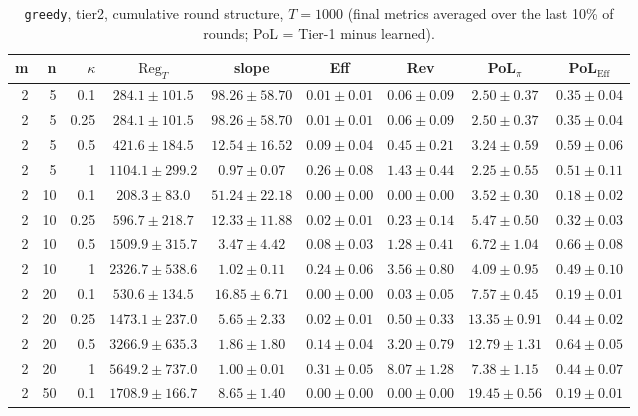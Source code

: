 \begin{table}[htbp]
\centering
\scriptsize
\caption{\texttt{greedy}, tier2, cumulative round structure, $T=1000$ (final metrics averaged over the last 10\% of rounds; PoL = Tier-1 minus learned).}
\label{tab:tier2_greedy_cumulative}
\begin{tabular}{@{}rrrcccccc@{}}
\toprule
m & n & $\kappa$ & $\mathrm{Reg}_T$ & slope & Eff & Rev & PoL$_\pi$ & PoL$_\mathrm{Eff}$ \\
\midrule
2 & 5 & 0.1 & $284.1 \pm 101.5$ & $98.26 \pm 58.70$ & $0.01 \pm 0.01$ & $0.06 \pm 0.09$ & $2.50 \pm 0.37$ & $0.35 \pm 0.04$ \\
2 & 5 & 0.25 & $284.1 \pm 101.5$ & $98.26 \pm 58.70$ & $0.01 \pm 0.01$ & $0.06 \pm 0.09$ & $2.50 \pm 0.37$ & $0.35 \pm 0.04$ \\
2 & 5 & 0.5 & $421.6 \pm 184.5$ & $12.54 \pm 16.52$ & $0.09 \pm 0.04$ & $0.45 \pm 0.21$ & $3.24 \pm 0.59$ & $0.59 \pm 0.06$ \\
2 & 5 & 1 & $1104.1 \pm 299.2$ & $0.97 \pm 0.07$ & $0.26 \pm 0.08$ & $1.43 \pm 0.44$ & $2.25 \pm 0.55$ & $0.51 \pm 0.11$ \\
2 & 10 & 0.1 & $208.3 \pm 83.0$ & $51.24 \pm 22.18$ & $0.00 \pm 0.00$ & $0.00 \pm 0.00$ & $3.52 \pm 0.30$ & $0.18 \pm 0.02$ \\
2 & 10 & 0.25 & $596.7 \pm 218.7$ & $12.33 \pm 11.88$ & $0.02 \pm 0.01$ & $0.23 \pm 0.14$ & $5.47 \pm 0.50$ & $0.32 \pm 0.03$ \\
2 & 10 & 0.5 & $1509.9 \pm 315.7$ & $3.47 \pm 4.42$ & $0.08 \pm 0.03$ & $1.28 \pm 0.41$ & $6.72 \pm 1.04$ & $0.66 \pm 0.08$ \\
2 & 10 & 1 & $2326.7 \pm 538.6$ & $1.02 \pm 0.11$ & $0.24 \pm 0.06$ & $3.56 \pm 0.80$ & $4.09 \pm 0.95$ & $0.49 \pm 0.10$ \\
2 & 20 & 0.1 & $530.6 \pm 134.5$ & $16.85 \pm 6.71$ & $0.00 \pm 0.00$ & $0.03 \pm 0.05$ & $7.57 \pm 0.45$ & $0.19 \pm 0.01$ \\
2 & 20 & 0.25 & $1473.1 \pm 237.0$ & $5.65 \pm 2.33$ & $0.02 \pm 0.01$ & $0.50 \pm 0.33$ & $13.35 \pm 0.91$ & $0.44 \pm 0.02$ \\
2 & 20 & 0.5 & $3266.9 \pm 635.3$ & $1.86 \pm 1.80$ & $0.14 \pm 0.04$ & $3.20 \pm 0.79$ & $12.79 \pm 1.31$ & $0.64 \pm 0.05$ \\
2 & 20 & 1 & $5649.2 \pm 737.0$ & $1.00 \pm 0.01$ & $0.31 \pm 0.05$ & $8.07 \pm 1.28$ & $7.38 \pm 1.15$ & $0.44 \pm 0.07$ \\
2 & 50 & 0.1 & $1708.9 \pm 166.7$ & $8.65 \pm 1.40$ & $0.00 \pm 0.00$ & $0.00 \pm 0.00$ & $19.45 \pm 0.56$ & $0.19 \pm 0.01$ \\

\end{tabular}
\end{table}
